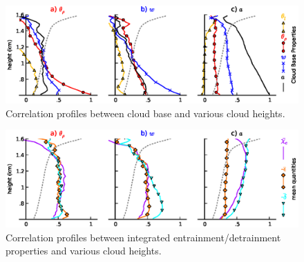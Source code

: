 \documentclass[acp]{copernicus}
\begin{document}
\begin{figure}[t]
\vspace*{2mm}
\begin{center}
\includegraphics[width=\textwidth]{./figures/cloud_base_profiles}
\end{center}
\caption{Correlation profiles between cloud base and various cloud heights.}
\label{fig:cloud_base_profiles}
\end{figure}

\begin{figure}[t]
\vspace*{2mm}
\begin{center}
\includegraphics[width=\textwidth]{./figures/cloud_base_integrals_env}
\end{center}
\caption{Correlation profiles between integrated entrainment/detrainment 
properties and various cloud heights.}
\label{fig:cloud_base_integrals_env}
\end{figure}

\end{document}

